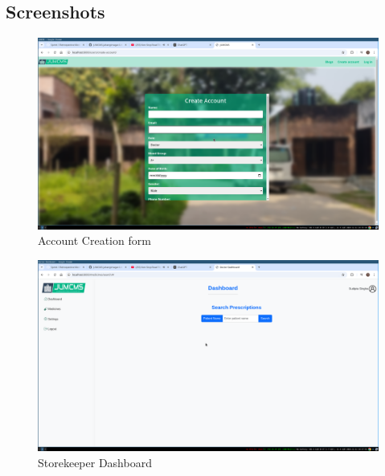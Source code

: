 \documentclass[a4paper,12pt]{article}
\begin{document}
\subsection{Screenshots}
\begin{figure}[H]
    \centering
    \includegraphics[width=1\textwidth]{images/spr1output2.png}
    \caption{Account Creation form}
    \label{fig:accountcreation}
\end{figure}

\begin{figure}[H]
    \centering
    \includegraphics[width=1\textwidth]{images/spr1output3.png}
    \caption{Storekeeper Dashboard}
    \label{fig:storekeeperdashboard}
\end{figure}
\end{document}
